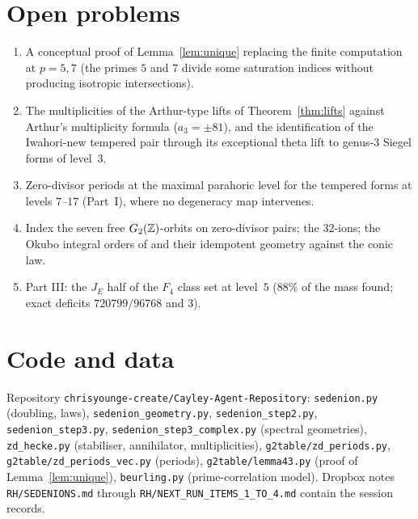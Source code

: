 \documentclass[11pt]{amsart}
\theoremstyle{definition}
\begin{document}
\section{Open problems}
\begin{enumerate}[leftmargin=2em]
\item A conceptual proof of Lemma~\ref{lem:unique} replacing the finite computation at $p=5,7$ (the primes $5$ and $7$ divide some saturation indices without producing isotropic intersections).
\item The multiplicities of the Arthur-type lifts of Theorem~\ref{thm:lifts} against Arthur's multiplicity formula ($a_3=\pm 81$), and the identification of the Iwahori-new tempered pair through its exceptional theta lift to genus-$3$ Siegel forms of level~$3$.
\item Zero-divisor periods at the maximal parahoric level for the tempered forms at levels $7$--$17$ (Part~I), where no degeneracy map intervenes.
\item Index the seven free $G_2(\mathbb{Z})$-orbits on zero-divisor pairs; the $32$-ions; the Okubo integral orders of \cite{Corr26} and their idempotent geometry against the conic law.
\item Part III: the $J_E$ half of the $F_4$ class set at level~$5$ ($88\%$ of the mass found; exact deficits $720799/96768$ and $3$).
\end{enumerate}

\appendix
\section{Code and data}
Repository \texttt{chrisyounge-create/Cayley-Agent-Repository}: \texttt{sedenion.py} (doubling, laws), \texttt{sedenion\_geometry.py}, \texttt{sedenion\_step2.py}, \texttt{sedenion\_step3.py}, \texttt{sedenion\_step3\_complex.py} (spectral geometries), \texttt{zd\_hecke.py} (stabiliser, annihilator, multiplicities), \texttt{g2table/zd\_periods.py}, \texttt{g2table/zd\_periods\_vec.py} (periods), \texttt{g2table/lemma43.py} (proof of Lemma~\ref{lem:unique}), \texttt{beurling.py} (prime-correlation model). Dropbox notes \texttt{RH/SEDENIONS.md} through \texttt{RH/NEXT\_RUN\_ITEMS\_1\_TO\_4.md} contain the session records.
\end{document}
